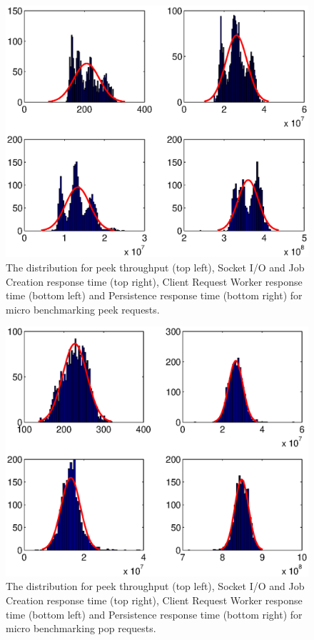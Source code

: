 \documentclass{article}
\begin{document}
\begin{table}
\begin{tabular}
        
        \begin{figure}[hbtp]
        \centering
        \includegraphics[scale=0.7]{img/histfit_peek_io_crw_db}
        \caption{The distribution for peek throughput (top left), Socket I/O and Job Creation response time (top right), Client Request Worker response time (bottom left) and Persistence response time (bottom right) for micro benchmarking peek requests.}
        \end{figure}
        
        \begin{figure}[hbtp]
        \centering
        \includegraphics[scale=0.7]{img/histfit_pop_io_crw_db}
        \caption{The distribution for peek throughput (top left), Socket I/O and Job Creation response time (top right), Client Request Worker response time (bottom left) and Persistence response time (bottom right) for micro benchmarking pop requests.}
        \end{figure}
        

\end{tabular}
\end{table}
\end{document}
